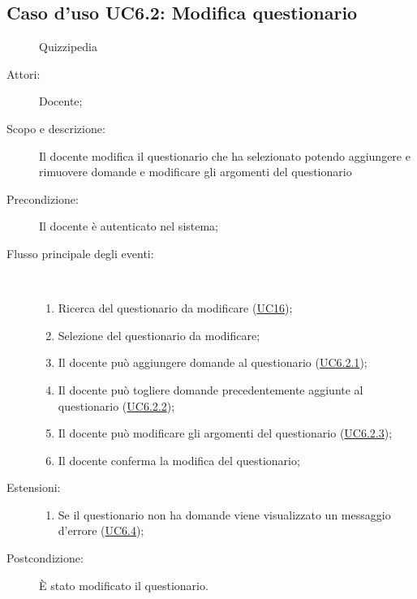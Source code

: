 \subsection{Caso d'uso UC6.2: Modifica questionario}
	\begin{figure}[H]
		\centering
		\begin{resizedtikzpicture}{\textwidth}
		\begin{umlsystem}[x=0, fill=lightgray!20]{Quizzipedia}
		\end{umlsystem}
		\end{resizedtikzpicture}
		\caption{}
	\end{figure}
\begin{description}
\item[Attori:] Docente;
\item[Scopo e descrizione:] Il docente modifica il questionario che ha selezionato potendo aggiungere e rimuovere domande e modificare gli argomenti del questionario
      \item[Precondizione:] Il docente è autenticato nel sistema;

        \item[Flusso principale degli eventi:] \ 
 \begin{enumerate}
          \item Ricerca del questionario da modificare (\hyperlink{UC16}{UC16});
          \item Selezione del questionario da modificare;
          \item Il docente può aggiungere domande al questionario (\hyperlink{UC6.2.1}{UC6.2.1});
          \item Il docente può togliere domande precedentemente aggiunte al questionario (\hyperlink{UC6.2.2}{UC6.2.2});
          \item Il docente può modificare gli argomenti del questionario (\hyperlink{UC6.2.3}{UC6.2.3});
          \item Il docente conferma la modifica del questionario;

      \end{enumerate}
    \item[Estensioni:]
      \begin{enumerate}
          \item Se il questionario non ha domande viene visualizzato un messaggio d'errore (\hyperlink{UC6.4}{UC6.4});

      \end{enumerate}
    \item[Postcondizione:] È stato modificato il questionario.
  \end{description}
\hypertarget{UC6.2.1}{}
